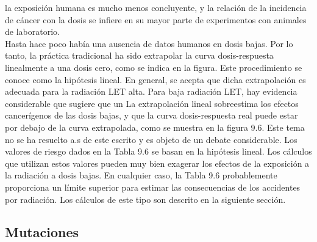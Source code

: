 \documentclass[]{article}
\begin{document}
la exposición humana es mucho menos concluyente, y la relación de la incidencia de cáncer con la dosis se infiere en su mayor parte de experimentos con animales de laboratorio.\\

Hasta hace poco había una ausencia de datos humanos en dosis bajas. Por lo tanto, la práctica tradicional ha sido extrapolar la curva dosis-respuesta linealmente a una dosis cero, como se indica en la figura. Este procedimiento se conoce como la hipótesis lineal. En general, se acepta que dicha extrapolación es adecuada para la radiación LET alta. Para baja radiación LET, hay evidencia considerable que sugiere que un
La extrapolación lineal sobreestima los efectos cancerígenos de las dosis bajas, y que la curva dosis-respuesta real puede estar por debajo de la curva extrapolada, como se muestra en la figura 9.6. Este tema no se ha resuelto a.s de este escrito y es objeto de un debate considerable.
Los valores de riesgo dados en la Tabla 9.6 se basan en la hipótesis lineal. Los cálculos que utilizan estos valores pueden muy bien exagerar los efectos de la exposición a la radiación a dosis bajas. En cualquier caso, la Tabla 9.6 probablemente proporciona un límite superior para estimar las consecuencias de los accidentes por radiación. Los cálculos de este tipo son descrito en la siguiente sección.\\

\subsection{Mutaciones} 
\end{document}
